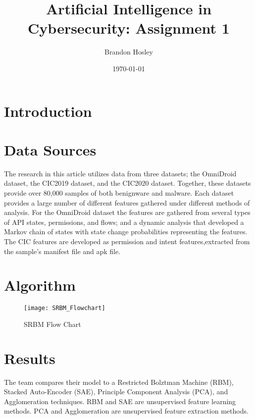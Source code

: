 \documentclass[]{article}
\title{Artificial Intelligence in Cybersecurity: Assignment 1}
\author{Brandon Hosley}
\date{\today}
\begin{document}
	\maketitle
	
\section{Introduction}

\section{Data Sources}

The research in this article utilizes data from three datasets; 
the OmniDroid \cite{Martin2019} dataset,  
the CIC2019 \cite{Taheri2019} dataset, and
the CIC2020 \cite{Rahali2020} dataset.
Together, these datasets provide over 80,000 samples of both benignware and malware.
Each dataset provides a large number of different features gathered under different methods of analysis.
For the OmniDroid dataset the features are gathered from several types of API states, permissions, and flows;
and a dynamic analysis that developed a Markov chain of states with state change probabilities representing the features.
The CIC features are developed as permission and intent features,extracted from the sample's manifest file and apk file.

\section{Algorithm}


\begin{figure}[h]
	\centering
	\texttt{[image: SRBM\_Flowchart]}
	\caption{SRBM Flow Chart \cite{Liu2021}}
\end{figure}


\section{Results}

The team compares their model to a Restricted Bolztman Machine (RBM), Stacked Auto-Encoder (SAE), Principle Component Analysis (PCA), and Agglomeration techniques.
RBM and SAE are unsupervised feature learning methods. 
PCA and Agglomeration are unsupervised feature extraction methods.
\end{document}

